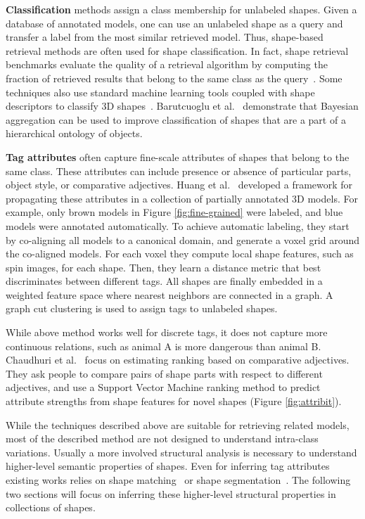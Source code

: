 \noindent \textbf{Classification} methods assign a class membership for unlabeled shapes. Given a database of annotated models, one can use an unlabeled shape as a query and transfer a label from the most similar retrieved model. Thus, shape-based retrieval methods are often used for shape classification. In fact, shape retrieval benchmarks evaluate the quality of a retrieval algorithm by computing the fraction of retrieved results that belong to the same class as the query~\cite{Shilane:2004:TPS}. Some techniques also use standard machine learning tools coupled with shape descriptors to classify 3D shapes~\cite{Frome:2004:rord,Golovinskiy:2009:SBR3D}. Barutcuoglu et al.~\cite{Barutcuoglu:2006:hscu} demonstrate that Bayesian aggregation can be used to improve classification of shapes that are a part of a hierarchical ontology of objects.


\noindent \textbf{Tag attributes} often capture fine-scale attributes of shapes that belong to the same class. These attributes can include presence or absence of particular parts, object style, or comparative adjectives. Huang et al.~\cite{Huang:2013:FSL} developed a framework for propagating these attributes in a collection of partially annotated 3D models. For example, only brown models in Figure \ref{fig:fine-grained} were labeled, and blue models were annotated automatically. To achieve automatic labeling, they start by co-aligning all models to a canonical domain, and generate a voxel grid around the co-aligned models. For each voxel they compute local shape features, such as spin images, for each shape. Then, they learn a distance metric that best discriminates between different tags. All shapes are finally embedded in a weighted feature space where nearest neighbors are connected in a graph. A graph cut clustering is used to assign tags to unlabeled shapes.


While above method works well for discrete tags, it does not capture more continuous relations, such as animal A is more dangerous than animal B.  Chaudhuri et al.~\cite{Chaudhuri:2013:ACC} focus on estimating ranking based on comparative adjectives. They ask people to compare pairs of shape parts with respect to different adjectives, and use a Support Vector Machine ranking method to predict attribute strengths from shape features for novel shapes (Figure \ref{fig:attribit}).

While the techniques described above are suitable for retrieving related models, most of the described method are not designed to understand intra-class variations. Usually a more involved structural analysis is necessary to understand higher-level semantic properties of shapes. Even for inferring tag attributes existing works relies on shape matching~\cite{Huang:2013:FSL} or shape segmentation~\cite{Chaudhuri:2013:ACC}. The following two sections will focus on inferring these higher-level structural properties in collections of shapes.

